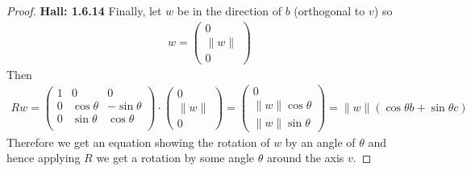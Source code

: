 \documentclass[11pt]{article}
\theoremstyle{definition}
\begin{document}
\begin{proof}{\textbf{Hall: 1.6.14}}
Finally, let $w$ be in the direction of $b$ (orthogonal to $v$) so
\begin{align*}
    w = \begin{pmatrix} 0 \\ \|w\| \\ 0 \end{pmatrix}
\end{align*} 
Then
\begin{align*}
    Rw = \begin{pmatrix}
        1 & 0 & 0\\
        0 & \cos\theta & -\sin\theta\\
        0 & \sin\theta & \cos\theta\\
    \end{pmatrix}\cdot \begin{pmatrix} 0 \\ \|w\| \\ 0 \end{pmatrix}
    = \begin{pmatrix}
        0 \\ \|w\|\cos\theta \\ \|w\|\sin\theta
    \end{pmatrix}
    = \|w\|(\cos\theta b + \sin\theta c)
\end{align*} 
Therefore we get an equation showing the rotation of $w$ by an angle of
$\theta$ and hence applying $R$ we get a rotation by some angle $\theta$
around the axis $v$.
\end{proof}
\cleardoublepage
\end{document}
